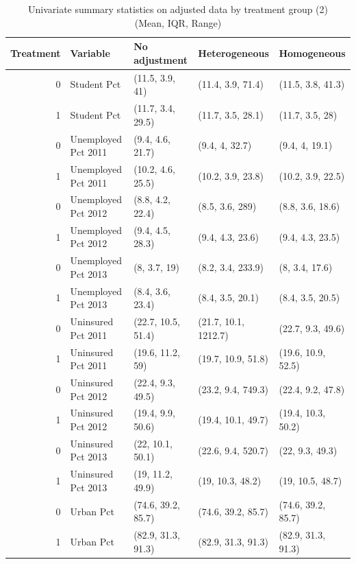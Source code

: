 \begin{table}[h!]
\centering
    \caption{Univariate summary statistics on adjusted data by treatment group (2)\\ (Mean, IQR, Range)}
    \label{tab:summarytab2}
\begin{tabular}{rllll}
  \hline
Treatment & Variable & No adjustment & Heterogeneous & Homogeneous \\ 
  \hline
  0 & Student Pct & (11.5, 3.9, 41) & (11.4, 3.9, 71.4) & (11.5, 3.8, 41.3) \\ 
  1 & Student Pct & (11.7, 3.4, 29.5) & (11.7, 3.5, 28.1) & (11.7, 3.5, 28) \\ 
  0 & Unemployed Pct 2011 & (9.4, 4.6, 21.7) & (9.4, 4, 32.7) & (9.4, 4, 19.1) \\ 
  1 & Unemployed Pct 2011 & (10.2, 4.6, 25.5) & (10.2, 3.9, 23.8) & (10.2, 3.9, 22.5) \\ 
  0 & Unemployed Pct 2012 & (8.8, 4.2, 22.4) & (8.5, 3.6, 289) & (8.8, 3.6, 18.6) \\ 
  1 & Unemployed Pct 2012 & (9.4, 4.5, 28.3) & (9.4, 4.3, 23.6) & (9.4, 4.3, 23.5) \\ 
  0 & Unemployed Pct 2013 & (8, 3.7, 19) & (8.2, 3.4, 233.9) & (8, 3.4, 17.6) \\ 
  1 & Unemployed Pct 2013 & (8.4, 3.6, 23.4) & (8.4, 3.5, 20.1) & (8.4, 3.5, 20.5) \\ 
  0 & Uninsured Pct 2011 & (22.7, 10.5, 51.4) & (21.7, 10.1, 1212.7) & (22.7, 9.3, 49.6) \\ 
  1 & Uninsured Pct 2011 & (19.6, 11.2, 59) & (19.7, 10.9, 51.8) & (19.6, 10.9, 52.5) \\ 
  0 & Uninsured Pct 2012 & (22.4, 9.3, 49.5) & (23.2, 9.4, 749.3) & (22.4, 9.2, 47.8) \\ 
  1 & Uninsured Pct 2012 & (19.4, 9.9, 50.6) & (19.4, 10.1, 49.7) & (19.4, 10.3, 50.2) \\ 
  0 & Uninsured Pct 2013 & (22, 10.1, 50.1) & (22.6, 9.4, 520.7) & (22, 9.3, 49.3) \\ 
  1 & Uninsured Pct 2013 & (19, 11.2, 49.9) & (19, 10.3, 48.2) & (19, 10.5, 48.7) \\ 
  0 & Urban Pct & (74.6, 39.2, 85.7) & (74.6, 39.2, 85.7) & (74.6, 39.2, 85.7) \\ 
  1 & Urban Pct & (82.9, 31.3, 91.3) & (82.9, 31.3, 91.3) & (82.9, 31.3, 91.3) \\ 
  \hline
\end{tabular}
\end{table}

